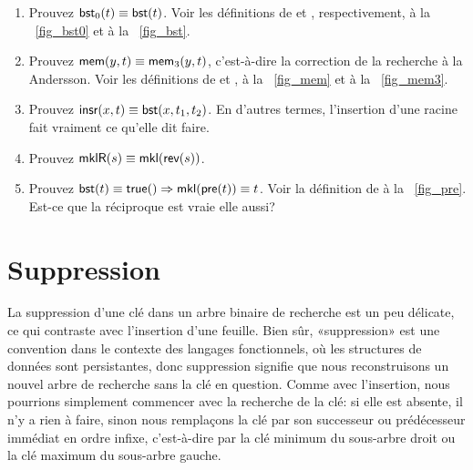 \begin{enumerate}

  \item Prouvez \(\textsf{bst}_0(t) \equiv \textsf{bst}(t)\). Voir les
  définitions de  et
  , respectivement, à la
  \fig~\vref{fig_bst0} et à la \fig~\vref{fig_bst}.

  \item Prouvez \(\textsf{mem}(y,t) \equiv \textsf{mem}_3(y,t)\), c'est-à-dire
  la correction de la recherche à la Andersson. Voir les définitions
  de  et
  , à la
  \fig~\vref{fig_mem} et à la \fig~\vref{fig_mem3}.

  \item Prouvez \(\textsf{insr}(x,t) \equiv \textsf{bst}(x,t_1,t_2)\).
   En d'autres termes, l'insertion d'une
  racine fait vraiment ce qu'elle dit faire.

  \item Prouvez \(\textsf{mklR}(s) \equiv \textsf{mkl}(\textsf{rev}(s))\).
   

  \item Prouvez \(\textsf{bst}(t) \equiv \textsf{true}() \Rightarrow
  \textsf{mkl}(\textsf{pre}(t)) \equiv t\). Voir la définition de
    à la \fig~\vref{fig_pre}. Est-ce
  que la réciproque est vraie elle aussi?

\end{enumerate}

\section{Suppression}

La suppression d'une clé dans un arbre binaire de recherche est un peu
délicate, ce qui contraste avec l'insertion d'une feuille. Bien sûr,
«suppression» est une convention dans le contexte des langages
fonctionnels, où les structures de données sont persistantes, donc
suppression signifie que nous reconstruisons un nouvel arbre de
recherche sans la clé en question. Comme avec l'insertion, nous
pourrions simplement commencer avec la recherche de la clé: si elle
est absente, il n'y a rien à faire, sinon nous remplaçons la clé par
son successeur ou prédécesseur immédiat en ordre infixe, c'est-à-dire
par la clé minimum du sous-arbre droit ou la clé maximum du sous-arbre
gauche.

